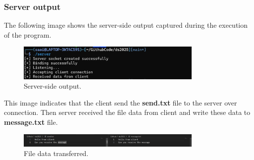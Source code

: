 \documentclass{article}
\begin{document}
\clearpage
\subsubsection{Server output}
The following image shows the server-side output captured during the execution of the program.

\begin{figure}[h!]
    \centering
    \includegraphics[width=0.8\textwidth]{image_s.png} 
    \caption{Server-side output.}
    \label{fig:server_output}
\end{figure}

\noindent
This image indicates that the client send the \textbf{send.txt }file to the server over connection. Then server received the file data from client and write these data to \textbf{message.txt} file.

\begin{figure}[h]
    \centering
    \includegraphics[width=0.8\textwidth]{image.png} 
    \caption{File data transferred.}
    \label{fig:file}
\end{figure}
\end{document}
